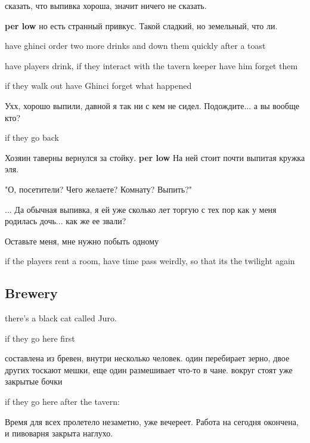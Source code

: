\documentclass[a5paper,11pt]{book}
\begin{document}
\begin{multicols}{2}
\begin{boxed}
  сказать, что выпивка хороша, значит ничего не сказать.

  \textbf{per low} но есть странный привкус. Такой сладкий, но земельный, что ли. 
\end{boxed}

have ghinci order two more drinks and down them quickly after a toast

have players drink, if they interact with the tavern keeper have him forget them

if they walk out have Ghinci forget what happened

\begin{boxed}
  Ухх, хорошо выпили, давной я так ни с кем не сидел. Подождите... а вы вообще кто?
\end{boxed}

if they go back

\begin{boxed}
  Хозяин таверны вернулся за стойку. \textbf{per low} На ней стоит почти выпитая кружка эля.

  "О, посетители? Чего желаете? Комнату? Выпить?"

  ... Да обычная выпивка, я ей уже сколько лет торгую с тех пор как у меня родилась дочь... как же ее звали?

  Оставьте меня, мне нужно побыть одному
\end{boxed}

if the players rent a room, have time pass weirdly, so that its the twilight again

\subsection{Brewery}
there's a black cat called Juro.

if they go here first

\begin{boxed}
  составлена из бревен, внутри несколько человек. один перебирает зерно, двое других тоскают мешки, еще один размешивает что-то в чане. вокруг стоят уже закрытые бочки
\end{boxed}

if they go here after the tavern:

\begin{boxed}
  Время для всех пролетело незаметно, уже вечереет. Работа на сегодня окончена, и пивоварня закрыта наглухо.


\end{boxed}
\end{multicols}
\end{document}
